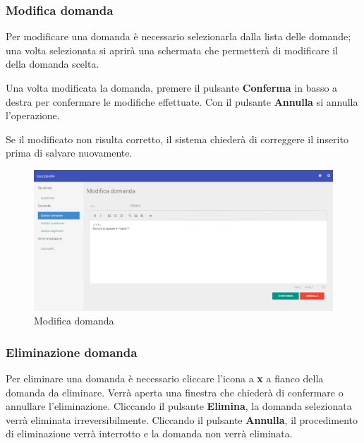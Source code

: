 \documentclass[12pt,a4paper]{article}
\begin{document}
	\subsubsection{Modifica domanda}
	\par Per modificare una domanda è necessario selezionarla dalla lista delle domande; una volta selezionata si aprirà una schermata che permetterà di modificare il  della domanda scelta. \\
	\par Una volta modificata la domanda, premere il pulsante \textbf{Conferma} in basso a destra per confermare le modifiche effettuate. Con il pulsante \textbf{Annulla} si annulla l'operazione. \\
	\par Se il  modificato non risulta corretto, il sistema chiederà di correggere il  inserito prima di salvare nuovamente. \\
	
		\begin{figure}[H]	
			\centering
			\includegraphics[width=\linewidth]{../img/screenshot/modificaDomanda.png}
			\caption{Modifica domanda}
			\label{Modifica domanda}
		\end{figure}
	
	\subsubsection{Eliminazione domanda}
	
	\par Per eliminare una domanda è necessario cliccare l'icona a \textbf{x} a fianco della domanda da eliminare.
	Verrà aperta una finestra che chiederà di confermare o annullare l'eliminazione. Cliccando il pulsante \textbf{Elimina}, la domanda selezionata verrà eliminata irreversibilmente. Cliccando il pulsante \textbf{Annulla}, il procedimento di eliminazione verrà interrotto e la domanda non verrà eliminata. \\
	
\end{document}
